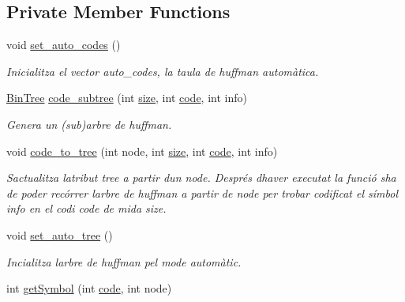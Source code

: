 \subsection*{Private Member Functions}
\begin{DoxyCompactItemize}
\item 
void \hyperlink{classdomini_1_1algorithm_1_1Huffman_a82b44a2aaa1d3726263a79a6562b7a6f}{set\+\_\+auto\+\_\+codes} ()
\begin{DoxyCompactList}\small\item\em Inicialitza el vector auto\+\_\+codes, la taula de huffman automàtica. \end{DoxyCompactList}\item 
\hyperlink{classdomini_1_1utils_1_1BinTree}{Bin\+Tree} \hyperlink{classdomini_1_1algorithm_1_1Huffman_acd2537482f8d719bb37c23ba2d8ec0b1}{code\+\_\+subtree} (int \hyperlink{classdomini_1_1algorithm_1_1Huffman_a9ebf8a890196bc1f3af6917707c1096f}{size}, int \hyperlink{classdomini_1_1algorithm_1_1Huffman_a6ff0cdc5b992431ccfe8d77971ebf5e8}{code}, int info)
\begin{DoxyCompactList}\small\item\em Genera un (sub)arbre de huffman. \end{DoxyCompactList}\item 
void \hyperlink{classdomini_1_1algorithm_1_1Huffman_a3337f12f1de140551c5a68cb7bab5126}{code\+\_\+to\+\_\+tree} (int node, int \hyperlink{classdomini_1_1algorithm_1_1Huffman_a9ebf8a890196bc1f3af6917707c1096f}{size}, int \hyperlink{classdomini_1_1algorithm_1_1Huffman_a6ff0cdc5b992431ccfe8d77971ebf5e8}{code}, int info)
\begin{DoxyCompactList}\small\item\em S\textquotesingle{}actualitza l\textquotesingle{}atribut \textquotesingle{}tree\textquotesingle{} a partir d\textquotesingle{}un node. Després d\textquotesingle{}haver executat la funció s\textquotesingle{}ha de poder recórrer l\textquotesingle{}arbre de huffman a partir de node per trobar codificat el símbol \textquotesingle{}info\textquotesingle{} en el codi \textquotesingle{}code\textquotesingle{} de mida \textquotesingle{}size\textquotesingle{}. \end{DoxyCompactList}\item 
void \hyperlink{classdomini_1_1algorithm_1_1Huffman_a688b01855a68e8de4fb75f47dd775fe6}{set\+\_\+auto\+\_\+tree} ()
\begin{DoxyCompactList}\small\item\em Incialitza l\textquotesingle{}arbre de huffman pel mode automàtic. \end{DoxyCompactList}\item 
int \hyperlink{classdomini_1_1algorithm_1_1Huffman_ad1dafb062b641d7294fa057c3a7d053e}{get\+Symbol} (int \hyperlink{classdomini_1_1algorithm_1_1Huffman_a6ff0cdc5b992431ccfe8d77971ebf5e8}{code}, int node)
\end{DoxyCompactItemize}
